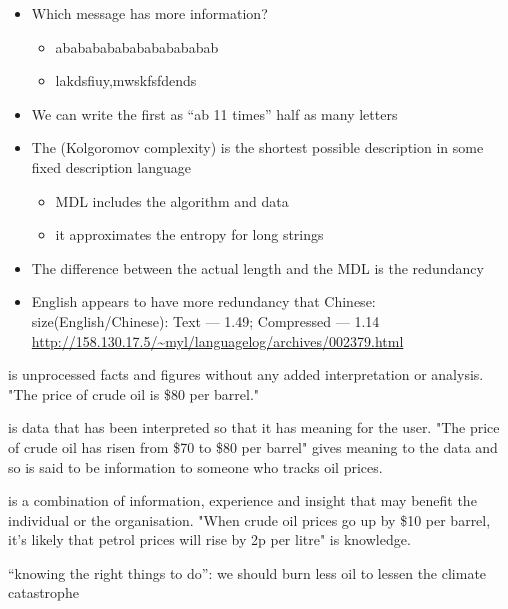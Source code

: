 \documentclass[a4paper,landscape,headrule,footrule,xetex]{foils}
\begin{document}
\begin{itemize}
\item Which message has more information?
  \begin{itemize}
  \item ababababababababababab
  \item lakdsfiuy,mwskfsfdends
  \end{itemize}
\item We can write the first as ``ab 11 times'' half as many letters
\item The  (Kolgoromov complexity) is
  the shortest possible description in some fixed description language

  \begin{itemize}
  \item MDL includes the algorithm and data
  \item it approximates the entropy for long strings
  \end{itemize}
\item The difference between the actual length and the MDL is the redundancy
\item English appears to have more redundancy that Chinese:
  \\ size(English/Chinese):  Text --- 1.49; Compressed --- 1.14
\\ \url{http://158.130.17.5/~myl/languagelog/archives/002379.html}
\end{itemize}

\begin{description}
\item {} is unprocessed facts and figures without any added interpretation or analysis. "The price of crude oil is \$80 per barrel."
\item {} is data that has been interpreted so that it has meaning for the user. "The price of crude oil has risen from \$70 to \$80 per barrel" gives meaning to the data and so is said to be information to someone who tracks oil prices.
\item {} is a combination of information, experience and insight that may benefit the individual or the organisation. "When crude oil prices go up by \$10 per barrel, it's likely that petrol prices will rise by 2p per litre" is knowledge.
\item {} ``knowing the right things to do'': we should burn
  less oil to lessen the climate catastrophe
  
\end{description}
\end{document}
